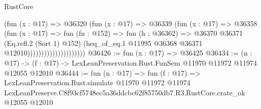\begin{lexlean}{RustCore}
\begin{coremodule}
                                    (fun (x : @17) =>
                                    @36320
                                      (fun (x : @17) =>
                                      @36339
                                        (fun (x : @17) =>
                                        @36358
                                          (fun (x : @17) =>
                                          fun (fn : @152) =>
                                          fun (h : @36362) =>
                                          @36370
                                            @36371
                                            (Eq.refl.{2} (Sort 1) @152)
                                            (heq_of_eq.{1}
                                              @11995
                                              @36368
                                              @36371
                                              @12010)))))))))))))))))))))
@36426 := fun (x : @17) => @36425
@36434 := (n : @17) ->
  (f : @17) -> LexLeanPreservation.Rust.FunSem @11970 @11972 @11974 @12055 @12010
@36444 := fun (n : @17) =>
  fun (f : @17) =>
  LexLeanPreservation.Rust.simulate
    @11970
    @11972
    @11974
    LexLeanPreserve.C8f93cf5748ec5a36ddcbc62f85750db7.R3.RustCore.crate_ok
    @12055
    @12010
\end{coremodule}
\end{lexlean}
